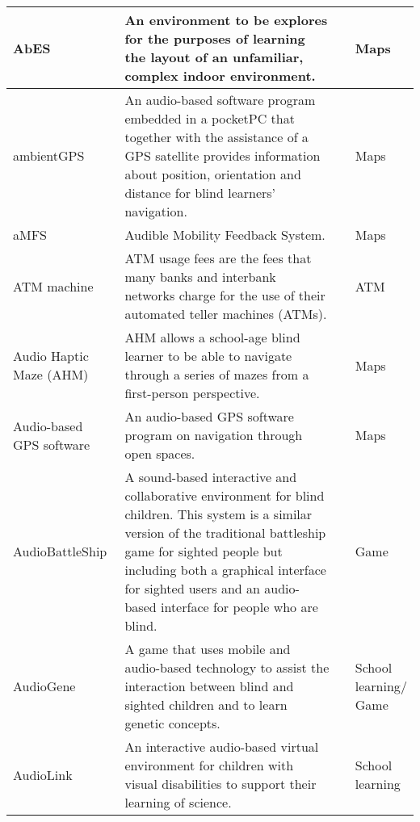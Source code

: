 \begin{small}
\begin{longtable}[h]{m{2.7cm}m{7cm}m{3cm}m{2cm}}
            AbES & An environment to be explores for the purposes of learning the layout of an unfamiliar, complex indoor environment. & {\tiny \cite{Connors2014,Connors2013,Sanchez2014,Jain2011}} & Maps \\ \hline
            
            ambientGPS & An audio-based software program embedded in a pocketPC that together with the assistance of a GPS satellite provides information about position, orientation and distance for blind learners’ navigation. & {\tiny \cite{Reads2009}} & Maps \\ \hline
            
            aMFS & Audible Mobility Feedback System. & {\tiny \cite{Adebiyi2017}} & Maps \\ \hline
            
            ATM machine & ATM usage fees are the fees that many banks and interbank networks charge for the use of their automated teller machines (ATMs). & {\tiny \cite{Shafiq2014}} & ATM \\ \hline
            
            Audio Haptic Maze (AHM) & AHM allows a school-age blind learner to be able to navigate through a series of mazes from a first-person perspective. & {\tiny \cite{ISI:000304018900033,Sanchez2013a,Sanchez2014Multimodal}} & Maps \\ \hline
            
            Audio-based GPS software & An audio-based GPS software program on navigation through open spaces. & {\tiny \cite{Sanchez2010autonomous}} & Maps \\ \hline
            
            AudioBattleShip & A sound-based interactive and collaborative environment for blind children. This system is a similar version of the traditional battleship game for sighted people but including both a graphical interface for sighted users and an audio-based interface for people who are blind. & {\tiny \cite{Sanchez2005b,Sanchez2004}} & Game \\ \hline
            
            AudioGene & A game that uses mobile and audio-based technology to assist the interaction between blind and sighted children and to learn genetic concepts. & {\tiny \cite{AudioGene}} & School learning$/$Game \\ \hline
            
            AudioLink & An interactive audio-based virtual environment for children with visual disabilities to support their learning of science. & {\tiny \cite{Sanchez2007science,Sanchez2009a}} & School learning \\ \hline
            

\end{longtable}
\end{small}
